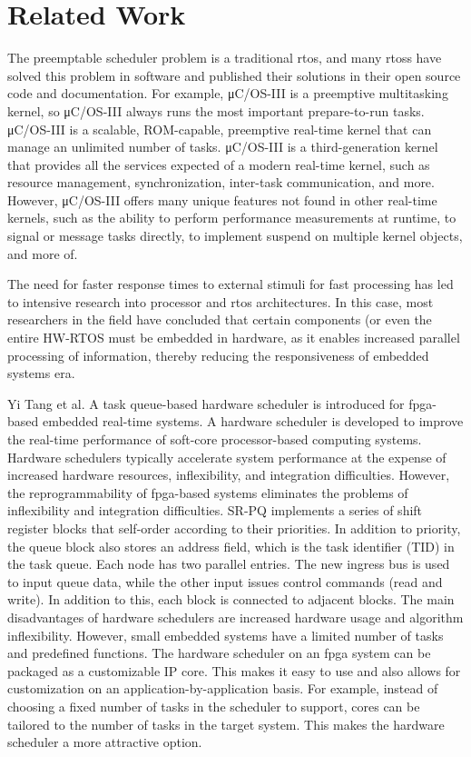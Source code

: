 \chapter{Related Work}
\label{sec:related_work}

The preemptable scheduler problem is a traditional \gls{rtos}, and many \gls{rtos}s have solved this problem in software and published their solutions in their open source code and documentation. For example, μC/OS-III is a preemptive multitasking kernel\cite{microCOS}, so μC/OS-III always runs the most important prepare-to-run tasks. μC/OS-III is a scalable, ROM-capable, preemptive real-time kernel that can manage an unlimited number of tasks. μC/OS-III is a third-generation kernel that provides all the services expected of a modern real-time kernel, such as resource management, synchronization, inter-task communication, and more. However, μC/OS-III offers many unique features not found in other real-time kernels, such as the ability to perform performance measurements at runtime, to signal or message tasks directly, to implement suspend on multiple kernel objects, and more of.

The need for faster response times to external stimuli for fast processing has led to intensive research into processor and \gls{rtos} architectures\cite{Stallings2008}. In this case, most researchers in the field have concluded that certain components (or even the entire HW-RTOS must be embedded in hardware, as it enables increased parallel processing of information, thereby reducing the responsiveness of embedded systems era.

Yi Tang et al. A task queue-based hardware scheduler is introduced for \gls{fpga}-based embedded real-time systems\cite{TangYi2015}. A hardware scheduler is developed to improve the real-time performance of soft-core processor-based computing systems. Hardware schedulers typically accelerate system performance at the expense of increased hardware resources, inflexibility, and integration difficulties. However, the reprogrammability of \gls{fpga}-based systems eliminates the problems of inflexibility and integration difficulties. SR-PQ implements a series of shift register blocks that self-order according to their priorities\cite{Saez1999}. In addition to priority, the queue block also stores an address field, which is the task identifier (TID) in the task queue. Each node has two parallel entries. The new ingress bus is used to input queue data, while the other input issues control commands (read and write). In addition to this, each block is connected to adjacent blocks. The main disadvantages of hardware schedulers are increased hardware usage and algorithm inflexibility. However, small embedded systems have a limited number of tasks and predefined functions. The hardware scheduler on an \gls{fpga} system can be packaged as a customizable IP core. This makes it easy to use and also allows for customization on an application-by-application basis. For example, instead of choosing a fixed number of tasks in the scheduler to support, cores can be tailored to the number of tasks in the target system. This makes the hardware scheduler a more attractive option.

